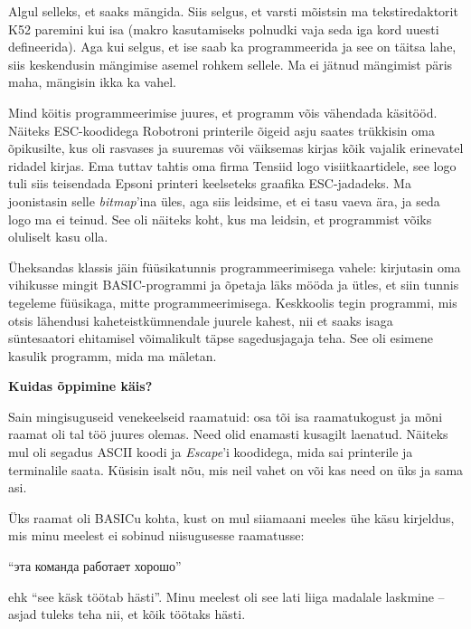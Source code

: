 Algul selleks, et saaks mängida. Siis selgus, et varsti mõistsin ma 
tekstiredaktorit K52 paremini kui isa (makro kasutamiseks polnudki vaja seda
iga kord uuesti defineerida). Aga kui selgus, et ise saab ka programmeerida ja
see on täitsa lahe, siis keskendusin mängimise asemel rohkem sellele. Ma ei
jätnud mängimist päris maha, mängisin ikka ka vahel.

Mind köitis programmeerimise juures, et programm võis vähendada käsitööd.
Näiteks ESC-koodidega Robotroni printerile õigeid asju saates trükkisin oma õpikusilte, kus oli
rasvases ja suuremas või väiksemas kirjas kõik vajalik erinevatel ridadel
kirjas. Ema tuttav tahtis oma firma Tensiid logo visiitkaartidele, see logo tuli
siis teisendada Epsoni printeri keelseteks graafika ESC-jadadeks. Ma joonistasin selle
\emph{bitmap}'ina üles, aga siis leidsime, et ei tasu vaeva ära, ja seda logo ma ei
teinud. See oli näiteks koht, kus ma leidsin, et programmist võiks oluliselt
kasu olla. 

Üheksandas klassis jäin füüsikatunnis
programmeerimisega vahele: kirjutasin oma vihikusse mingit BASIC-programmi ja
õpetaja läks mööda ja ütles, et siin tunnis tegeleme füüsikaga,
mitte programmeerimisega. Keskkoolis tegin programmi, mis otsis lähendusi
kaheteistkümnendale juurele kahest, nii et saaks isaga süntesaatori ehitamisel
võimalikult täpse sagedusjagaja teha. See oli esimene kasulik programm, mida ma mäletan.

\textbf{Kuidas õppimine käis?}

Sain mingisuguseid venekeelseid raamatuid: osa tõi isa raamatukogust ja
mõni raamat oli tal töö juures olemas. Need olid enamasti kusagilt
laenatud. Näiteks mul oli segadus ASCII koodi ja \emph{Escape}'i koodidega, mida
sai printerile ja terminalile saata. Küsisin isalt nõu,
mis neil vahet on või kas need on üks ja sama asi. 

Üks raamat oli BASICu kohta, kust on mul siiamaani meeles ühe
käsu kirjeldus, mis minu meelest ei sobinud niisugusesse raamatusse:
\begin{russian}\enquote{эта команда работает хорошо}\end{russian} ehk \enquote{see käsk
töötab hästi}. Minu meelest oli see lati liiga madalale laskmine -- asjad tuleks teha nii, et kõik töötaks hästi.

